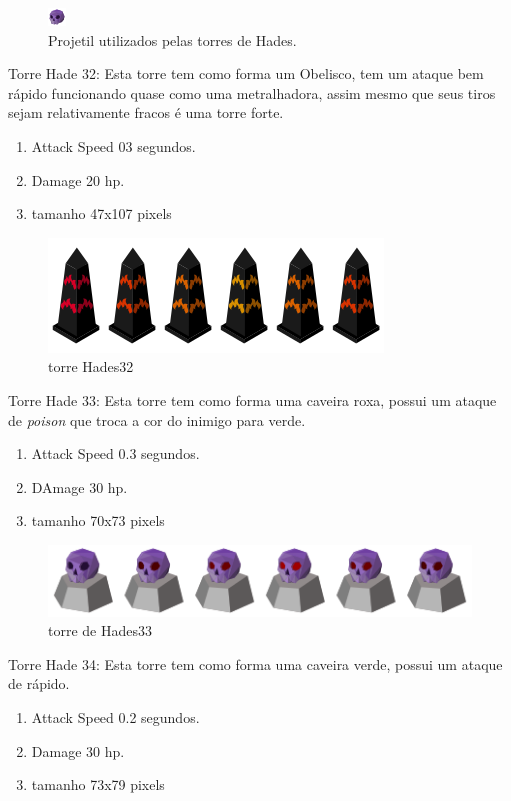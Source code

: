 \documentclass[11pt]{article} %
\begin{document}
\begin{figure}[!htp]
\centering
\includegraphics[scale=1]{res/projectiles/projetil_caveira.png}
\caption{Projetil utilizados pelas torres de Hades.}
\end{figure}

Torre Hade 32: Esta torre tem como forma um Obelisco, tem um ataque bem rápido funcionando quase como uma metralhadora, assim mesmo que seus tiros sejam relativamente fracos é uma torre forte.
\begin{enumerate}
\item Attack Speed 03 segundos.
\item Damage 20 hp.
\item tamanho 47x107 pixels
\end{enumerate}

\begin{figure}[!htp]
\centering
\includegraphics[scale=1]{res/towers/tower_32.png}
\caption{torre Hades32}
\end{figure}

Torre Hade 33: Esta torre tem como forma uma caveira roxa, possui um ataque de \textit{poison} que troca a cor do inimigo para verde.
\begin{enumerate}
\item Attack Speed 0.3 segundos.
\item DAmage 30 hp.
\item tamanho 70x73 pixels
\end{enumerate}

\begin{figure}[!htp]
\centering
\advance\leftskip-3cm
\advance\rightskip-3cm
\includegraphics[scale=1.3]{res/towers/tower_33.png}
\caption{torre de Hades33}
\end{figure}

Torre Hade 34: Esta torre tem como forma uma caveira verde, possui um ataque de rápido.
\begin{enumerate}
\item Attack Speed 0.2 segundos.
\item Damage 30 hp.
\item tamanho 73x79 pixels
\end{enumerate}
\end{document}
